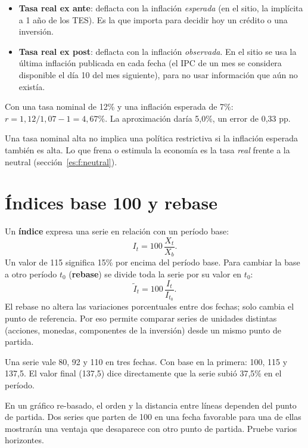 \begin{itemize}
\item \textbf{Tasa real ex ante}: deflacta con la inflación \emph{esperada} (en el sitio, la implícita a 1 año
  de los TES). Es la que importa para decidir hoy un crédito o una inversión.
\item \textbf{Tasa real ex post}: deflacta con la inflación \emph{observada}. En el sitio se usa la última
  inflación publicada en cada fecha (el IPC de un mes se considera disponible el día 10 del mes siguiente), para
  no usar información que aún no existía.
\end{itemize}

\begin{dato}
Con una tasa nominal de 12\% y una inflación esperada de 7\%: $r=1{,}12/1{,}07-1=4{,}67\%$. La aproximación daría
5,0\%, un error de 0,33 pp.
\end{dato}

\begin{leer}
Una tasa nominal alta no implica una política restrictiva si la inflación esperada también es alta. Lo que frena o
estimula la economía es la tasa \emph{real} frente a la neutral (sección~\ref{es:f:neutral}).
\end{leer}

\section{Índices base 100 y rebase}
\label{es:f:indices}
Un \textbf{índice} expresa una serie en relación con un período base:
\[
I_t=100\,\frac{X_t}{X_{b}}.
\]
Un valor de 115 significa 15\% por encima del período base. Para cambiar la base a otro período $t_0$
(\textbf{rebase}) se divide toda la serie por su valor en $t_0$:
\[
\tilde I_t = 100\,\frac{I_t}{I_{t_0}}.
\]
El rebase no altera las variaciones porcentuales entre dos fechas; solo cambia el punto de referencia. Por eso
permite comparar series de unidades distintas (acciones, monedas, componentes de la inversión) desde un mismo
punto de partida.

\begin{dato}
Una serie vale 80, 92 y 110 en tres fechas. Con base en la primera: 100, 115 y 137,5. El valor final (137,5) dice
directamente que la serie subió 37,5\% en el período.
\end{dato}

\begin{alerta}
En un gráfico re-basado, el orden y la distancia entre líneas dependen del punto de partida. Dos series que parten de
100 en una fecha favorable para una de ellas mostrarán una ventaja que desaparece con otro punto de partida. Pruebe
varios horizontes.
\end{alerta}

